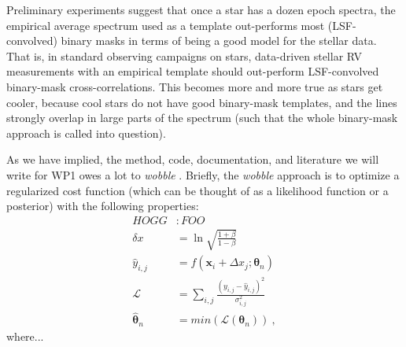 \documentclass[12pt]{article}
\begin{document}
Preliminary experiments suggest that once a star has a dozen epoch spectra, the empirical average spectrum used as a template out-performs most (LSF-convolved) binary masks in terms of being a good model for the stellar data.
That is, in standard observing campaigns on stars, data-driven stellar RV measurements with an empirical template should out-perform LSF-convolved binary-mask cross-correlations.
This becomes more and more true as stars get cooler, because cool stars do not have good binary-mask templates, and the lines strongly overlap in large parts of the spectrum (such that the whole binary-mask approach is called into question).

As we have implied, the method, code, documentation, and literature we will write for WP1 owes a lot to \textsl{wobble} \cite{Bedell2019}.
Briefly, the \textsl{wobble} approach is to optimize a regularized cost function (which can be thought of as a likelihood function or a posterior) with the following properties:
\begin{align}
    HOGG &: FOO \\
    \delta x & = \ln{\sqrt{\frac{1 + \beta}{1 - \beta}}} \\
    \hat{y}_{i,j} & = f (\boldsymbol{x}_i + \Delta x_{j}; \boldsymbol{\theta}_n ) \\
    \mathcal{L} & = \sum_{i,j} \frac{(y_{i,j} - \hat{y}_{i,j})^2}{\sigma_{i,j}^2} \\
    \hat{\boldsymbol{\theta}}_n & = min (\mathcal{L}(\boldsymbol{\theta}_n)) ~,
\end{align}
where...
\end{document}

